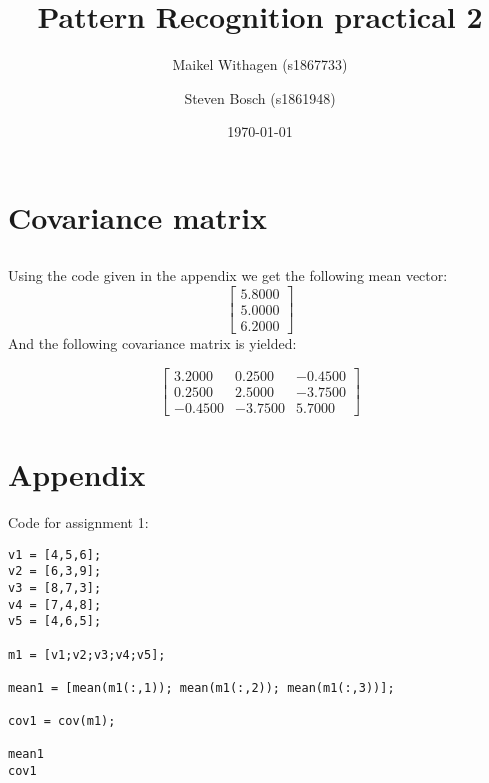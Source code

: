 \documentclass[10pt]{article}
\title{Pattern Recognition practical 2}
\author{Maikel Withagen (s1867733) \and Steven Bosch (s1861948)}
\date{\today}
\begin{document}
\maketitle

\section{Covariance matrix}
\subsection{}
Using the code given in the appendix we get the following mean vector:
\begin{equation}
    \begin{bmatrix}
      5.8000 \\
      5.0000 \\
      6.2000
    \end{bmatrix}
\end{equation}
And the following covariance matrix is yielded:

  \begin{equation}
    \begin{bmatrix}
      3.2000  &  0.2500 &  -0.4500 \\
      0.2500  &  2.5000 &  -3.7500 \\
    -0.4500 &  -3.7500 &   5.7000
    \end{bmatrix}
\end{equation}

\subsection{}



\section*{Appendix}
Code for assignment 1:
\begin{lstlisting}
v1 = [4,5,6];
v2 = [6,3,9];
v3 = [8,7,3];
v4 = [7,4,8];
v5 = [4,6,5];

m1 = [v1;v2;v3;v4;v5];

mean1 = [mean(m1(:,1)); mean(m1(:,2)); mean(m1(:,3))];

cov1 = cov(m1);

mean1
cov1
\end{lstlisting}
\end{document}

